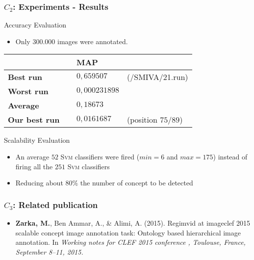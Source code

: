 \begin{frame}
	\frametitle{$C_{2}$: Experiments - Results}
	\begin{exampleblock}{Accuracy Evaluation}
		{\small
		\begin{itemize}		
			\item Only \alert{$300.000$} images were annotated.
		\end{itemize}
		\centering
		\begin{tabular}{ l| l l }
				\hline
				\textbf{\small } 	& \textbf{\small MAP} &	 \\
				\hline \hline
				\textbf{\small Best run}  & {\small $0,659507$}		& {\small(/SMIVA/21.run)} \\
				\textbf{\small Worst run} & {\small $0,000231898$}	&  \\
				\textbf{\small Average}	  & {\small $0,18673$} 		&  \\
				\textbf{\small Our best run~~}& {\small$0,0161687$} 	&  {\small(position $75/89$)} \\
				\hline
				\end{tabular}

		}
	\end{exampleblock}
	\begin{exampleblock}{Scalability Evaluation}
		{\small
		\begin{itemize}		
			\item An average \alert{$52$} \textsc{Svm} classifiers were fired ($min=6$ and $max=175$) 
				instead of firing all the \alert{$251$} \textsc{Svm} classifiers
			\item \alert{Reducing about $80\%$ the number of concept to be detected}
		\end{itemize}
		}
	\end{exampleblock}
\end{frame}

\begin{frame}
	\frametitle{$C_{3}$: Related publication}
	\begin{block}{}
		\begin{itemize}
			\item \citep{Zarka2015a} \textbf{Zarka, M.}, Ben Ammar, A., \&{} Alimi, A. (2015). 
				Regimvid at imageclef 2015 scalable concept image annotation 
				task: Ontology based hierarchical image annotation. 
				In \emph{Working notes for CLEF 2015 conference , 
				Toulouse, France, September 8--11, 2015.}
		\end{itemize}
	\end{block}	
\end{frame}
